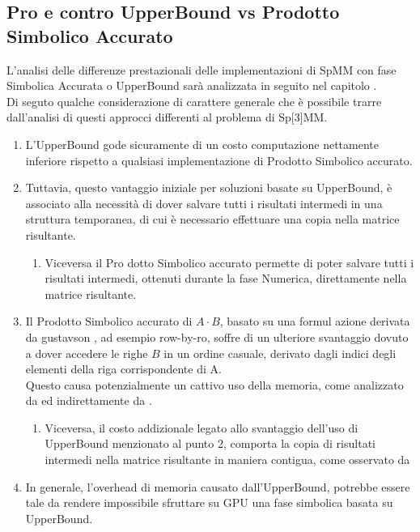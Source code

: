 \subsection{Pro e contro UpperBound vs Prodotto Simbolico Accurato} \label{chSpMMSymb:UB_VS_SYMBACC}
L'analisi delle differenze prestazionali delle implementazioni di SpMM con fase Simbolica Accurata o UpperBound
sarà analizzata in seguito nel capitolo .\\
Di seguto qualche considerazione di carattere generale che è possibile trarre dall'analisi di questi approcci differenti
al problema di Sp[3]MM.\\
\begin{enumerate}
	\item L'UpperBound gode sicuramente di un costo computazione nettamente inferiore 
	      rispetto a qualsiasi implementazione di Prodotto Simbolico accurato.\\
	\item Tuttavia, questo vantaggio iniziale per soluzioni basate su UpperBound, 
		  è associato alla necessità di dover salvare tutti i risultati intermedi in una struttura temporanea,
		  di cui è necessario effettuare una copia nella matrice risultante.
	\begin{enumerate}
		\item Viceversa il Pro dotto Simbolico accurato permette di poter salvare tutti i risultati intermedi,
			  ottenuti durante la fase Numerica, direttamente nella matrice risultante.
	\end{enumerate}
	\item Il Prodotto Simbolico  accurato di $A \cdot B$, 
		  basato su una formul azione derivata da gustavson , ad esempio row-by-ro,
		  soffre di un ulteriore svantaggio dovuto a dover accedere le righe $B$ in un ordine casuale, derivato 
		  dagli indici degli elementi \nnz della riga corrispondente di A.\\
		  Questo causa potenzialmente un cattivo uso della memoria, come analizzato da 
		   ed indirettamente da .
		\begin{enumerate}
			\label{chSpMMSymb:UB_VS_SYMBACC_rowbyrowContiguousCopyBack}
			\item Viceversa, il costo addizionale legato allo svantaggio dell'uso di UpperBound menzionato al punto 2, 
				  comporta la copia di risultati intermedi 
				  nella matrice risultante in maniera contigua, come osservato da 
		\end{enumerate}
	\item In generale, l'overhead di memoria causato dall'UpperBound, potrebbe essere tale da rendere impossibile 
		  sfruttare su GPU una fase simbolica basata su UpperBound. %
\end{enumerate}
